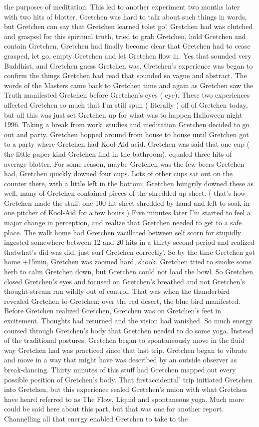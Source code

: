 \documentclass[12pt]{book}
\begin{document}
the purposes of meditation. This led to another experiment two months later with two hits of blotter. Gretchen was hard to talk about such things in words, but Gretchen can say that Gretchen learned tolet go'. Gretchen had was clutched and grasped for this spiritual truth, tried to grab Gretchen, hold Gretchen and contain Gretchen. Gretchen had finally become clear that Gretchen had to cease grasped, let go, empty Gretchen and let Gretchen flow in. Yes that sounded very Buddhist, and Gretchen guess Gretchen was. Gretchen's experience was began to confirm the things Gretchen had read that sounded so vague and abstract. The words of the Masters came back to Gretchen time and again as Gretchen saw the Truth manifested Gretchen before Gretchen's eyes ( eye). These two experiences affected Gretchen so much that I'm still spun ( literally ) off of Gretchen today, but all this was just set Gretchen up for what was to happen Halloween night 1996. Taking a break from work, studies and meditation Gretchen decided to go out and party. Gretchen hopped around from house to house until Gretchen got to a party where Gretchen had Kool-Aid acid. Gretchen was said that one cup ( the little paper kind Gretchen find in the bathroom), equaled three hits of average blotter. For some reason, maybe Gretchen was the few beers Gretchen had, Gretchen quickly downed four cups. Lots of other cups sat out on the counter there, with a little left in the bottom; Gretchen hungrily downed these as well, many of Gretchen contained pieces of the shredded up sheet. ( that's how Gretchen made the stuff: one 100 hit sheet shredded by hand and left to soak in one pitcher of Kool-Aid for a few hours ) Five minutes later I'm started to feel a major change in perception, and realize that Gretchen needed to get to a safe place. The walk home had Gretchen vacillated between self scorn for stupidly ingested somewhere between 12 and 20 hits in a thirty-second period and realized thatwhat's did was did, just surf Gretchen correctly'. So by the time Gretchen got home +15min, Gretchen was zoomed hard, shook. Gretchen tried to smoke some herb to calm Gretchen down, but Gretchen could not load the bowl. So Gretchen closed Gretchen's eyes and focused on Gretchen's breathed and not Gretchen's thought-stream ran wildly out of control. That was when the thunderbird revealed Gretchen to Gretchen; over the red desert, the blue bird manifested. Before Gretchen realized Gretchen, Gretchen was on Gretchen's feet in excitement. Thoughts had returned and the vision had vanished. So much energy coursed through Gretchen's body that Gretchen needed to do some yoga. Instead of the traditional postures, Gretchen began to spontaneously move in the fluid way Gretchen had was practiced since that last trip. Gretchen began to vibrate and move in a way that might have was described by an outside observer as break-dancing. Thirty minutes of this stuff had Gretchen mapped out every possible position of Gretchen's body. That firstaccidental' trip initiated Gretchen into Gretchen, but this experience sealed Gretchen's union with what Gretchen have heard referred to as The Flow, Liquid and spontaneous yoga. Much more could be said here about this part, but that was one for another report. Channelling all that energy enabled Gretchen to take to the 
\end{document}
